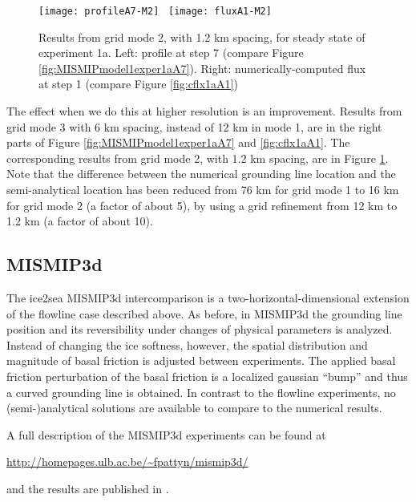 \begin{figure}[ht]
\centering
\texttt{[image: profileA7-M2]} \,
\texttt{[image: fluxA1-M2]}
\caption{Results from grid mode 2, with 1.2 km spacing, for steady state of experiment 1a.  Left: profile at step 7 (compare Figure \ref{fig:MISMIPmodel1exper1aA7}).  Right: numerically-computed flux at step 1 (compare Figure \ref{fig:cflx1aA1})}
\label{fig:MISMIPmode2results}
\end{figure}

The effect when we do this at higher resolution is an improvement.  Results from grid mode 3 with 6 km spacing, instead of 12 km in mode 1, are in the right parts of Figure \ref{fig:MISMIPmodel1exper1aA7} and \ref{fig:cflx1aA1}.  The corresponding results from grid mode 2, with 1.2 km spacing, are in Figure \ref{fig:MISMIPmode2results}.  Note that the difference between the numerical grounding line location and the semi-analytical location has been reduced from 76 km for grid mode 1 to 16 km for grid mode 2 (a factor of about 5), by using a grid refinement from 12 km to 1.2 km (a factor of about 10).


\subsection{MISMIP3d}\label{subsect:MISMIP3d}
The ice2sea MISMIP3d intercomparison is a two-horizontal-dimensional extension of the flowline case described above.  As before, in MISMIP3d the grounding line position and its reversibility under changes of physical parameters is analyzed.  Instead of changing the ice softness, however, the spatial distribution and magnitude of basal friction is adjusted between experiments.  The applied basal friction perturbation of the basal friction is a localized gaussian ``bump'' and thus a curved grounding line is obtained.  In contrast to the flowline experiments, no (semi-)analytical solutions are available to compare to the numerical results.

A full description of the MISMIP3d experiments can be found at

\centerline{\url{http://homepages.ulb.ac.be/~fpattyn/mismip3d/}}

\noindent and the results are published in \cite{MISMIP3d2013}.

